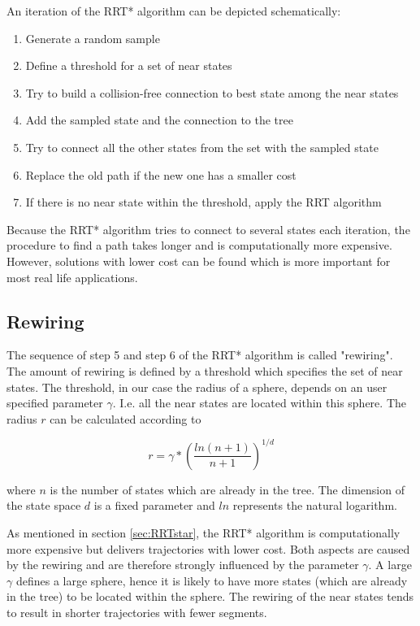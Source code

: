 An iteration of the RRT* algorithm can be depicted schematically:


\begin{enumerate}
  \item Generate a random sample
  \item Define a threshold for a set of near states
  \item Try to build a collision-free connection to best state among the near states
  \item Add the sampled state and the connection to the tree 
  \item Try to connect all the other states from the set with the sampled state 
  \item Replace the old path if the new one has a smaller cost
  \item If there is no near state within the threshold, apply the RRT algorithm
\end{enumerate}


Because the RRT* algorithm tries to connect to several states each iteration, the procedure to find a path takes longer and is computationally more expensive. However, solutions with lower cost can be found which is more important for most real life applications.

\subsection{Rewiring}\label{sec:Rewiring}

The sequence of step 5 and step 6 of the RRT* algorithm is called "rewiring". The amount of rewiring is defined by a threshold which specifies the set of near states. The threshold, in our case the radius of a sphere, depends on an user specified parameter $\gamma$. I.e. all the near states are located within this sphere. The radius $r$ can be calculated according to


\begin{equation}
r = \gamma * \left(\frac{ln(n+1)}{n+1}\right)^{1/d}
\label{equ:ballradius}
\end{equation}

where $n$ is the number of states which are already in the tree. The dimension of the state space $d$ is a fixed parameter and $ln$ represents the natural logarithm.\newline

As mentioned in section \ref{sec:RRTstar}, the RRT* algorithm is computationally more expensive but delivers trajectories with lower cost. Both aspects are caused by the rewiring and are therefore strongly influenced by the parameter $\gamma$. A large $\gamma$ defines a large sphere, hence it is likely to have more states (which are already in the tree) to be located within the sphere. The rewiring of the near states tends to result in shorter trajectories with fewer segments.\newline

